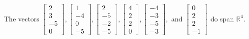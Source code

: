 \begin{exercise}
\begin{exerciseStatement}
  \end{exerciseStatement}
  \begin{exerciseAnswer}
   The vectors \(\left[\begin{array}{r}
2 \\
3 \\
-5 \\
0
\end{array}\right] , \left[\begin{array}{r}
1 \\
-4 \\
0 \\
-5
\end{array}\right] , \left[\begin{array}{r}
2 \\
-5 \\
-2 \\
-5
\end{array}\right] , \left[\begin{array}{r}
4 \\
2 \\
2 \\
0
\end{array}\right] , \left[\begin{array}{r}
-4 \\
-3 \\
-5 \\
-3
\end{array}\right] , \text{ and } \left[\begin{array}{r}
0 \\
2 \\
2 \\
-1
\end{array}\right]\) 
  	 do  
	span \(\mathbb{R}^4\).
  


  \end{exerciseAnswer}
\end{exercise}